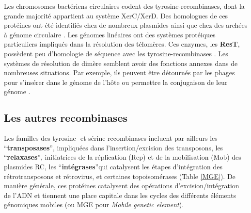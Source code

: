 	Les chromosomes bactériens circulaires codent des tyrosine-recombinases, dont la grande majorité appartient au système XerC/XerD. Des homologues de ces protéines ont été identifiés chez de nombreux plasmides ainsi que chez des archées à génome circulaire \citep{hallet2004dna}. Les génomes linéaires ont des systèmes protéiques particuliers impliqués dans la résolution des télomères. Ces enzymes, les \textbf{ResT}, possèdent peu d'homologie de séquence avec les tyrosine-recombinases \citep{chaconas2005linear}. Les systèmes de résolution de dimère semblent avoir des fonctions annexes dans de nombreuses situations. Par exemple, ils peuvent être détournés par les phages pour s'insérer dans le génome de l'hôte ou permettre la conjugaison de leur génome \citep{Das2013,hallet2004dna} .
 
 
\subsection{Les autres recombinases}\label{parmge}
	Les familles des tyrosine- et sérine-recombinases incluent par ailleurs les “\textbf{transposases}”, impliquées dans l'insertion/excision des transposons, les “\textbf{relaxases}”, initiatrices de la réplication (Rep) et de la mobilisation (Mob) des plasmides RC, les “\textbf{intégrases}”qui catalysent les étapes d'intégration des rétrotransposons et rétrovirus, et certaines topoisomérases (Table \ref{MGE}). De manière générale, ces protéines catalysent des opérations d'excision/intégration de l'ADN et tiennent une place capitale dans les cycles des différents éléments génomiques mobiles (ou MGE pour \textit{Mobile genetic element}). 

